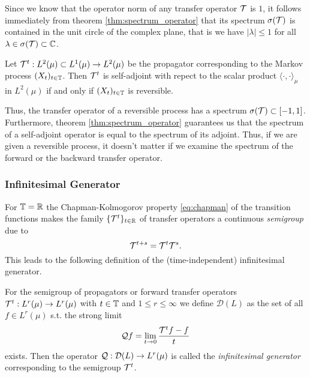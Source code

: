 Since we know that the operator norm of any transfer operator $\mathcal{T}$ is $1$, it follows immediately from theorem \ref{thm:spectrum_operator} that its spectrum $\sigma(\mathcal{T})$ is contained in the unit circle of the complex plane, that is we have $| \lambda | \leq 1$ for all $\lambda \in \sigma(\mathcal{T}) \subset \mathbb{C}$. %

\begin{thm}
\label{thm:selfadjoint_reversible}
Let $\mathcal{T}^t: L^2(\mu) \subset L^1(\mu) \rightarrow L^2(\mu)$ be the propagator corresponding to the Markov process $(X_t)_{t\in\mathbb{T}}$. Then $\mathcal{T}^t$ is self-adjoint with repect to the scalar product $\langle \cdot, \cdot \rangle_\mu$ in $L^2(\mu)$
if and only if $(X_t)_{t\in\mathbb{T}}$ is reversible.
\end{thm}

Thus, the transfer operator of a reversible process has a spectrum $\sigma(\mathcal{T}) \subset [-1, 1]$.
Furthermore, theorem \ref{thm:spectrum_operator} guarantees us that the spectrum of a self-adjoint operator is equal to the spectrum of its adjoint. Thus, if we are given a reversible process, it doesn't matter if we examine the spectrum of the forward or the backward transfer operator.

\subsubsection*{Infinitesimal Generator}

For $\mathbb{T} = \mathbb{R}$ the Chapman-Kolmogorov property \eqref{eq:chapman} of the transition functions makes the family $\{\mathcal{T}^t\}_{t\in\mathbb{R}}$ of transfer operators a continuous \textit{semigroup} due to  
\begin{equation*}
\mathcal{T}^{t+s} = \mathcal{T}^t \mathcal{T}^s.
\end{equation*}
This leads to the following definition of the (time-independent) infinitesimal generator.

\begin{defi}
For the semigroup of propagators or forward transfer operators $\mathcal{T}^t : L^r (\mu) \rightarrow L^r (\mu)$ with $t \in \mathbb{T}$ and $1\leq r \leq \infty$ we define $\mathcal{D}(L)$ as the set of all $f \in L^r(\mu)$ s.t. the strong limit
\begin{equation*}
\mathcal{Q} f = \lim_{t \rightarrow 0} \frac{\mathcal{T}^t f - f}{t}
\end{equation*}
exists. Then the operator $\mathcal{Q}: \mathcal{D}(L) \rightarrow L^r(\mu)$ is called the \textit{infinitesimal generator} corresponding to the semigroup $\mathcal{T}^t$.
\end{defi}

